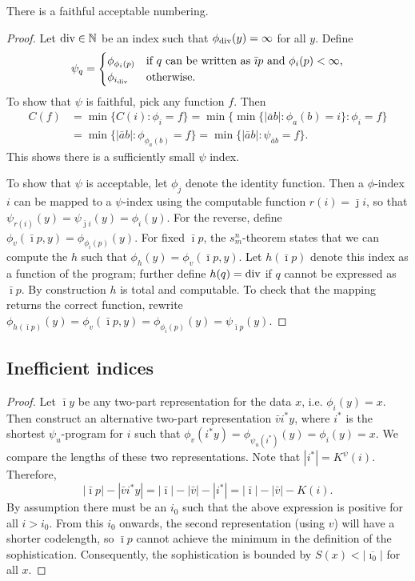 \documentclass{style/llncs}
\newcommand{\N}{\mathbb N}
\newcommand{\tn}[1]{\textnormal{#1}}
\newcommand{\s}{S}
\begin{document}
\begin{lemma}
  There is a faithful acceptable numbering.\label{lemma:faithful-numberings}
\end{lemma}
\begin{proof}
Let $\tn{div} \in \N$ be an index such that $\phi_{\tn{div}}(y)=\infty$ for all $y$. Define
  \[\psi_q=\begin{cases}
    \phi_{\phi_i(p)}&\tn{if $q$ can be written as $\bar\imath p$ and $\phi_i(p)<\infty$,}\\
    \phi_{i_\tn{div}}&\tn{otherwise.}\end{cases}
  \]
  To show that $\psi$ is faithful, pick any function $f$. Then
\[\begin{split}
C(f)&=\min\{C(i):\phi_i=f\} =\min\{\min\{|\bar a b|:\phi_a(b)=i\}:\phi_i=f\} \\
& =\min\{|\bar a b|:\phi_{\phi_a(b)}=f\}
 =\min\{|\bar a b|:\psi_{\bar a b}=f\}.
\end{split}\]
This shows there is a sufficiently small $\psi$ index.

To show that $\psi$ is acceptable, let $\phi_j$ denote the identity
function. Then a $\phi$-index $i$ can be mapped to a $\psi$-index
using the computable function $r(i)=\bar\jmath i$, so that
$\psi_{r(i)}(y)=\psi_{\bar\jmath i}(y)=\phi_i(y)$. For the reverse,
define $\phi_v(\bar\imath p, y)=\phi_{\phi_i(p)}(y)$. For fixed
$\bar\imath p$, the 
$s^n_m$-theorem \cite{kleene193notation} states that we can compute the $h$
such that $\phi_h(y)=\phi_v(\bar\imath p,y)$. Let $h(\bar\imath p)$
denote this index as a function of the program; further define
$h(q)=\tn{div}$ if $q$ cannot be expressed as $\bar\imath p$. By
construction $h$ is total and computable. To check that the mapping
returns the correct function, rewrite $\phi_{h(\bar\imath
  p)}(y)=\phi_v(\bar\imath p,y)=\phi_{\phi_i(p)}(y)=\psi_{\bar\imath p}(y)$.
\end{proof}

\subsection{Inefficient indices}
\label{section:appendix-inefficient-indices}

\ineffprefix*
\begin{proof}
Let $\bar\imath y$ be any two-part representation for the data $x$, i.e. $\phi_i(y)=x$. Then construct an alternative two-part representation $\bar vi^* y$, where $i^*$ is the shortest $\psi_u$-program for $i$ such that $\phi_v(i^* y)=\phi_{\psi_u(i^*)}(y) = \phi_i(y)=x$. We compare the lengths of these two representations. Note that $|i^*|=K^\psi(i)$. Therefore,
\[
|\bar\imath p|-|\bar v i^* y| = |\bar\imath|-|\bar v| - |i^*| = |\bar\imath|-|\bar v|-K(i).
\]
By assumption there must be an $i_0$ such that the above expression is positive for all $i>i_0$. From this $i_0$ onwards, the second representation (using $v$) will have a shorter codelength, so $\bar\imath p$ cannot achieve the minimum in the definition of the sophistication. Consequently, the sophistication is bounded by $\s(x)<|\overline{\imath_0}|$ for all $x$. 
\end{proof}
\end{document}
